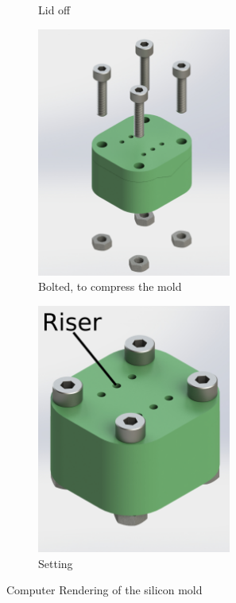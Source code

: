 \begin{figure}
\begin{subfigure}{.3\linewidth}
        \caption{Lid off}
        \label{fig:LidOff}
    \end{subfigure}
        \begin{subfigure}{.3\linewidth}
        \centering
        \includegraphics[width=0.7\textwidth]{Images/mold/unbolted.png}
        \caption{Bolted, to compress the mold}
        \label{fig:unbolted}
    \end{subfigure}
    \begin{subfigure}{.3\linewidth}
        \centering
        \includegraphics[width=0.7\textwidth]{Images/mold/bolted.png}    
        \caption{Setting}
        \label{fig:Bolted}
    \end{subfigure}
    \caption{Computer Rendering of the silicon mold}
    \label{figure:moldCAD}
\end{figure}

